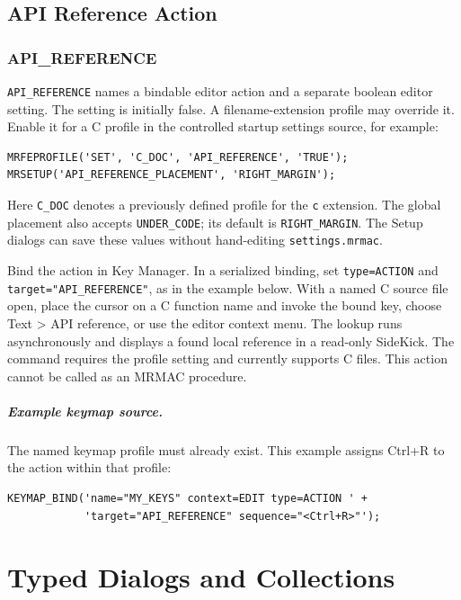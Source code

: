 \documentclass[a4paper,10pt,twoside,openany]{book}
\newenvironment{mrmacextension}{\begin{changebar}}{\end{changebar}}
\begin{document}
\section{API Reference Action}
\begin{mrmacextension}
\label{prim:action-api-reference}
\subsection*{API\_REFERENCE}

\texttt{API\_REFERENCE} names a bindable editor action and a separate boolean
editor setting. The setting is initially false. A
filename-extension profile may override it. Enable it for a C profile in the
controlled startup settings source, for example:
\begin{verbatim}
MRFEPROFILE('SET', 'C_DOC', 'API_REFERENCE', 'TRUE');
MRSETUP('API_REFERENCE_PLACEMENT', 'RIGHT_MARGIN');
\end{verbatim}
Here \texttt{C\_DOC} denotes a previously defined profile for the
\texttt{c} extension. The global placement also accepts
\texttt{UNDER\_CODE}; its default is \texttt{RIGHT\_MARGIN}. The Setup
dialogs can save these values without hand-editing \texttt{settings.mrmac}.

Bind the action in Key Manager. In a serialized binding, set
\texttt{type=ACTION} and \texttt{target="API\_REFERENCE"}, as in the example
below. With a named C source file open, place the cursor on a C function name
and invoke the bound key, choose \textsf{Text > API reference}, or use the editor context menu. The
lookup runs asynchronously and displays a found local reference in a
read-only SideKick. The command requires the profile setting and currently
supports C files. This action cannot be called as an MRMAC procedure.

\paragraph{Example keymap source.}
The named keymap profile must already exist. This example assigns Ctrl+R to
the action within that profile:
\begin{verbatim}
KEYMAP_BIND('name="MY_KEYS" context=EDIT type=ACTION ' +
            'target="API_REFERENCE" sequence="<Ctrl+R>"');
\end{verbatim}
\end{mrmacextension}

\chapter{Typed Dialogs and Collections}
\end{document}
